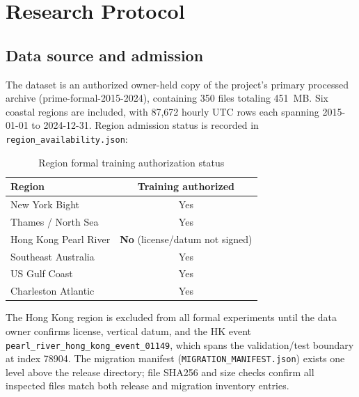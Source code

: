 \section{Research Protocol}
\label{sec:protocol}

\subsection{Data source and admission}
The dataset is an authorized owner-held copy of the project's primary
processed archive (prime-formal-2015-2024),
containing 350 files totaling 451~MB. Six coastal regions are included, with
87,672 hourly UTC rows each spanning 2015-01-01 to 2024-12-31. Region admission
status is recorded in \texttt{region\_availability.json}:

\begin{table}[htbp]
\centering
\caption{Region formal training authorization status}
\begin{tabular}{l c}
\toprule
Region & Training authorized \\
\midrule
New York Bight & Yes \\
Thames / North Sea & Yes \\
Hong Kong Pearl River & \textbf{No} (license/datum not signed) \\
Southeast Australia & Yes \\
US Gulf Coast & Yes \\
Charleston Atlantic & Yes \\
\bottomrule
\end{tabular}
\label{tab:regions}
\end{table}

The Hong Kong region is excluded from all formal experiments until the data owner
confirms license, vertical datum, and the HK event \texttt{pearl\_river\_hong\_kong\_event\_01149},
which spans the validation/test boundary at index 78904. The migration manifest
(\texttt{MIGRATION\_MANIFEST.json}) exists one level above the release directory;
file SHA256 and size checks confirm all inspected files match both release and
migration inventory entries.

